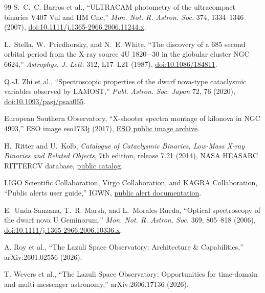 \documentclass[10pt,onecolumn]{article}
\let\appendixXfinish\relax
\def\appendixXfinish{\end{document}}
\begin{document}
\begin{thebibliography}{99}
S.~C.~C. Barros et al., ``ULTRACAM photometry of the ultracompact binaries
V407 Vul and HM Cnc,'' \emph{Mon. Not. R. Astron. Soc.} 374, 1334--1346
(2007),
\href{https://doi.org/10.1111/j.1365-2966.2006.11244.x}{doi:10.1111/j.1365-2966.2006.11244.x}.

L.~Stella, W.~Priedhorsky, and N.~E. White, ``The discovery of a 685 second
orbital period from the X-ray source 4U 1820$-$30 in the globular cluster
NGC 6624,'' \emph{Astrophys. J. Lett.} 312, L17--L21 (1987),
\href{https://doi.org/10.1086/184811}{doi:10.1086/184811}.

Q.-J. Zhi et al., ``Spectroscopic properties of the dwarf nova-type
cataclysmic variables observed by LAMOST,'' \emph{Publ. Astron. Soc. Japan}
72, 76 (2020),
\href{https://doi.org/10.1093/pasj/psaa065}{doi:10.1093/pasj/psaa065}.

European Southern Observatory, ``X-shooter spectra montage of kilonova in
NGC 4993,'' ESO image eso1733j (2017),
\href{https://www.eso.org/public/images/eso1733j/}{ESO public image archive}.

H.~Ritter and U.~Kolb, \emph{Catalogue of Cataclysmic Binaries, Low-Mass
X-ray Binaries and Related Objects}, 7th edition, release 7.21 (2014),
NASA HEASARC RITTERCV database,
\href{https://heasarc.gsfc.nasa.gov/w3browse/all/rittercv.html}{public catalog}.

LIGO Scientific Collaboration, Virgo Collaboration, and KAGRA Collaboration,
``Public alerts user guide,'' IGWN,
\href{https://emfollow.docs.ligo.org/userguide/}{public alert documentation}.

E.~Unda-Sanzana, T.~R. Marsh, and L.~Morales-Rueda, ``Optical spectroscopy
of the dwarf nova U Geminorum,'' \emph{Mon. Not. R. Astron. Soc.} 369,
805--818 (2006),
\href{https://doi.org/10.1111/j.1365-2966.2006.10336.x}{doi:10.1111/j.1365-2966.2006.10336.x}.

A. Roy et al., ``The Lazuli Space Observatory: Architecture \& Capabilities,''
arXiv:2601.02556 (2026).

T. Wevers et al., ``The Lazuli Space Observatory: Opportunities for time-domain
and multi-messenger astronomy,'' arXiv:2606.17136 (2026).

\end{thebibliography}

\appendixXfinish
\end{document}
